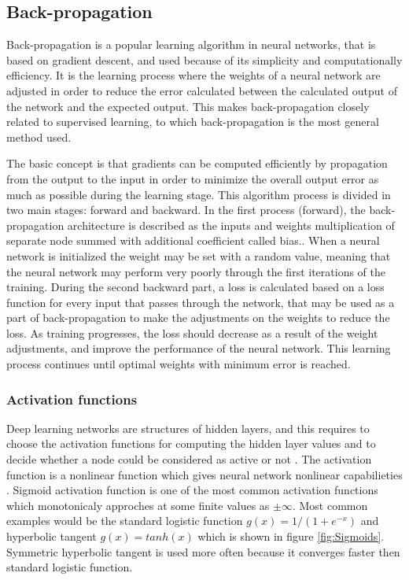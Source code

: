   
\subsection{Back-propagation}
Back-propagation is a popular learning algorithm in neural networks, that is based on gradient descent, and used because of its simplicity and computationally efficiency.\citep{Bengio2012, Duda2000} It is the learning process where the weights of a neural network are adjusted in order to reduce the error calculated between the calculated output of the network and the expected output. This makes back-propagation closely related to supervised learning, to which back-propagation is the most general method used.\citep{Duda2000}  

The basic concept is that gradients can be computed efficiently by propagation from the output to the input in order to minimize the overall output error as much as possible during the learning stage. This algorithm process is divided in two main stages: forward and backward. In the first process (forward), the back-propagation architecture is described as the inputs and weights multiplication of separate node summed with additional coefficient called bias.\citep{Hameed2016,LeCun1998}. When a neural network is initialized the weight may be set with a random value, meaning that the neural network may perform very poorly through the first iterations of the training.
During the second backward part, a loss is calculated based on a loss function for every input that passes through the network, that may be used as a part of back-propagation to make the adjustments on the weights to reduce the loss. As training progresses, the loss should decrease as a result of the weight adjustments, and improve the performance of the neural network.\citep{LeCun2015, Goodfellow2016, Duda2000}   
This learning process continues until optimal weights with minimum error is reached.\citep{Hameed2016}
\noindent

\subsubsection{Activation functions}
Deep learning networks are structures of hidden layers, and this requires to choose the activation functions for computing the hidden layer values and to decide whether a node could be considered as active or not \citep{Goodfellow2016}. The activation function is a nonlinear function which gives neural network nonlinear capabilieties \citep{Bengio2012}.\newline
\noindent
Sigmoid activation function is one of the most common activation functions which monotonicaly approches at some finite values as $\pm\infty$. Most common examples would be the standard logistic function $g(x) = 1/(1 + e^{-x})$ and hyperbolic tangent $g(x) = tanh(x)$  which is shown in figure \ref{fig:Sigmoids}. Symmetric hyperbolic tangent is used more often because it converges faster then standard logistic function.\citep{Bengio2012}


